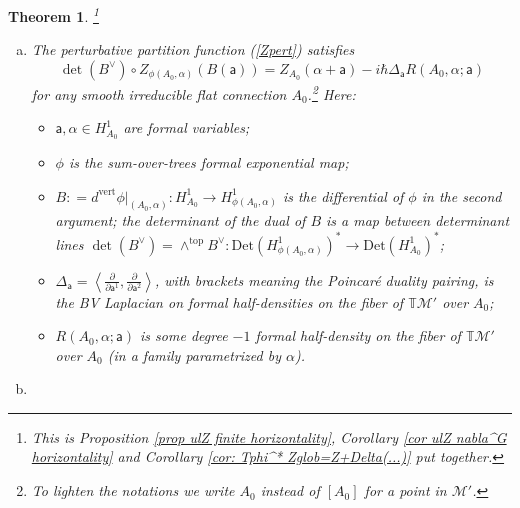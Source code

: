 \documentclass[11pt,a4paper]{amsart}
\theoremstyle{plain} %
\newtheorem{thm}{Theorem}[section]
\theoremstyle{definition}
\theoremstyle{remark}
\newcommand{\mr}{\mathrm}
\newcommand{\sfa}{\mathsf{a}}
\newcommand{\ra}{\rightarrow}
\newcommand{\M}{\mathcal{M}}
\begin{document}
\begin{thm}\footnote{
This is Proposition \ref{prop ulZ finite horizontality}, Corollary \ref{cor ulZ nabla^G horizontality} and Corollary \ref{cor: Tphi^* Zglob=Z+Delta(...)} put together.
} \label{intro thm A}
\begin{enumerate}[(a)]
    \item \label{intro thm A (a)}
    The perturbative partition function (\ref{Zpert}) satisfies %
    \begin{equation}\label{intro: Z finite horizontality eq}
     \det(B^\vee)\circ  Z_{\phi(A_0,\alpha)}( B(\sfa))
        = Z_{A_0}(\alpha+\sfa)-i\hbar\Delta_\sfa  R(A_0,\alpha;\sfa)
    \end{equation}
    for any smooth irreducible flat connection $A_0$.\footnote{To lighten the notations we write $A_0$ instead of $[A_0]$ for a point in $\M'$.} Here: 
    \begin{itemize}
   \item  $\sfa,\alpha \in H^1_{A_0}$  are formal variables; 
   \item $\phi$ is the sum-over-trees formal exponential map; 
   \item $B\colon=d^\mr{vert}\phi|_{(A_0,\alpha)}\colon H^1_{A_0}\ra H^1_{\phi(A_0,\alpha)}$ is the differential of $\phi$ in the second %
    argument; the determinant of the dual of $B$ is a map between determinant lines $\det (B^\vee)=\wedge^\mr{top}B^\vee\colon \mr{Det}(H^1_{\phi(A_0,\alpha)})^*\ra \mr{Det}(H^1_{A_0})^*$;
    \item $\Delta_\sfa = \left\langle \frac{\partial}{\partial \sfa^{1}},\frac{\partial}{\partial \sfa^{2}}\right\rangle$, with brackets meaning the Poincar\'e duality pairing, is the BV Laplacian on formal half-densities on the fiber of $\mathbb{T}\M'$ over $A_0$; %
    \item $R(A_0,\alpha;\sfa)$ is some degree $-1$ formal half-density on the fiber of $\mathbb{T}\M'$ over $A_0$ (in a family parametrized by $\alpha$). 
    \end{itemize}
    \item \label{intro thm A (b)}

\end{enumerate}
\end{thm}
\end{document}
